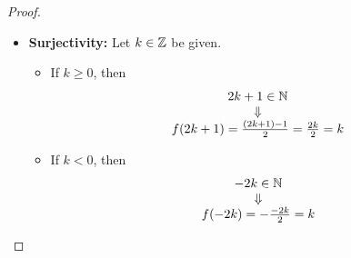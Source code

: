 \begin{proof}
\begin{itemize}
\begin{itemize}
\[            \begin{array}{c}
                \frac{n_{1} - 1}{2} = \frac{n_{2} - 1}{2} \\
                \Downarrow \\
                n_{1} = n_{2}
            \end{array}
            \]
        \end{itemize}
        \item \textbf{Surjectivity:} Let $k \in \mathbb{Z}$ be given.
        \begin{itemize}
            \item If $k \geq 0$, then
            \[
            \begin{array}{c}
                2k + 1 \in \mathbb{N} \\
                \Downarrow \\
                f(2k + 1) = \frac{(2k + 1) - 1}{2} = \frac{2k}{2} = k
            \end{array}
            \]
            \item If $k < 0$, then
            \[
            \begin{array}{c}
                -2k \in \mathbb{N} \\
                \Downarrow \\
                f(-2k) = - \frac{-2k}{2} = k
            \end{array}
            \]
        \end{itemize}
    \end{itemize}
\end{proof}
